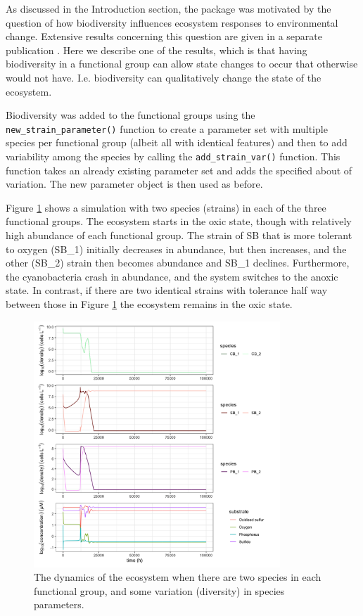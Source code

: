 \documentclass[preprint,12pt, a4paper]{elsarticle}
\begin{document}
As discussed in the Introduction section, the package was motivated by
the question of how biodiversity influences ecosystem responses to
environmental change. Extensive results concerning this question are
given in a separate publication \citet{Limberger2022}. Here we describe
one of the results, which is that having biodiversity in a functional
group can allow state changes to occur that otherwise would not have.
I.e. biodiversity can qualitatively change the state of the ecosystem.

Biodiversity was added to the functional groups using the
\texttt{new\_strain\_parameter()} function to create a parameter set
with multiple species per functional group (albeit all with identical
features) and then to add variability among the species by calling the
\texttt{add\_strain\_var()} function. This function takes an already
existing parameter set and adds the specified about of variation. The
new parameter object is then used as before.

Figure \ref{fig:uc3} shows a simulation with two species (strains) in
each of the three functional groups. The ecosystem starts in the oxic
state, though with relatively high abundance of each functional group.
The strain of SB that is more tolerant to oxygen (SB\_1) initially
decreases in abundance, but then increases, and the other (SB\_2) strain
then becomes abundance and SB\_1 declines. Furthermore, the
cyanobacteria crash in abundance, and the system switches to the anoxic
state. In contrast, if there are two identical strains with tolerance
half way between those in Figure \ref{fig:uc3} the ecosystem remains in
the oxic state.

\begin{figure}

{\centering \includegraphics[width=350px]{figures/uc3_supplement_5_4} 

}

\caption{The dynamics of the ecosystem when there are two species in each functional group, and some variation (diversity) in species parameters.}\label{fig:uc3}
\end{figure}
\end{document}
